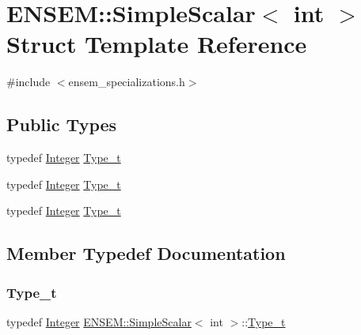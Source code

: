 \hypertarget{structENSEM_1_1SimpleScalar_3_01int_01_4}{}\section{E\+N\+S\+EM\+:\+:Simple\+Scalar$<$ int $>$ Struct Template Reference}
\label{structENSEM_1_1SimpleScalar_3_01int_01_4}


{\ttfamily \#include $<$ensem\+\_\+specializations.\+h$>$}

\subsection*{Public Types}
\begin{DoxyCompactItemize}
\item 
typedef \mbox{\hyperlink{group__defs_gab13d060149cdd80ab40fd8d653f60117}{Integer}} \mbox{\hyperlink{structENSEM_1_1SimpleScalar_3_01int_01_4_a3d6a45a8cd225aba61dd4c2593501d66}{Type\+\_\+t}}
\item 
typedef \mbox{\hyperlink{group__defs_gab13d060149cdd80ab40fd8d653f60117}{Integer}} \mbox{\hyperlink{structENSEM_1_1SimpleScalar_3_01int_01_4_a3d6a45a8cd225aba61dd4c2593501d66}{Type\+\_\+t}}
\item 
typedef \mbox{\hyperlink{group__defs_gab13d060149cdd80ab40fd8d653f60117}{Integer}} \mbox{\hyperlink{structENSEM_1_1SimpleScalar_3_01int_01_4_a3d6a45a8cd225aba61dd4c2593501d66}{Type\+\_\+t}}
\end{DoxyCompactItemize}


\subsection{Member Typedef Documentation}
\mbox{\label{structENSEM_1_1SimpleScalar_3_01int_01_4_a3d6a45a8cd225aba61dd4c2593501d66}} 
\subsubsection{\texorpdfstring{Type\_t}{Type\_t}\hspace{0.1cm}{\footnotesize\ttfamily [1/3]}}
{\footnotesize\ttfamily typedef \mbox{\hyperlink{group__defs_gab13d060149cdd80ab40fd8d653f60117}{Integer}} \mbox{\hyperlink{structENSEM_1_1SimpleScalar}{E\+N\+S\+E\+M\+::\+Simple\+Scalar}}$<$ int $>$\+::\mbox{\hyperlink{structENSEM_1_1SimpleScalar_3_01int_01_4_a3d6a45a8cd225aba61dd4c2593501d66}{Type\+\_\+t}}}

